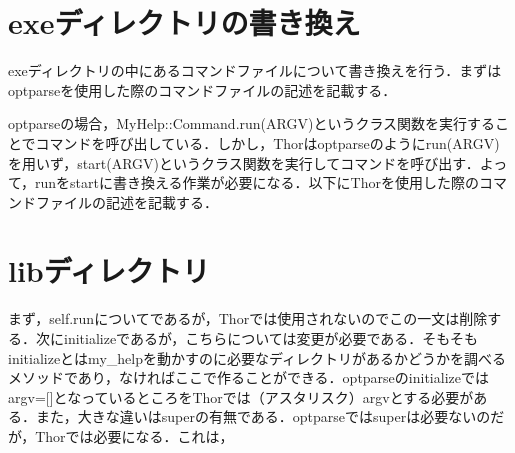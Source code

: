 \section{exeディレクトリの書き換え}\label{exeux30c7ux30a3ux30ecux30afux30c8ux30eaux306eux66f8ux304dux63dbux3048}

exeディレクトリの中にあるコマンドファイルについて書き換えを行う．まずはoptparseを使用した際のコマンドファイルの記述を記載する．

\begin{Shaded}
\begin{Highlighting}[]

\NormalTok{::}\NormalTok{)}
\end{Highlighting}
\end{Shaded}

optparseの場合，MyHelp::Command.run(ARGV)というクラス関数を実行することでコマンドを呼び出している．しかし，Thorはoptparseのようにrun(ARGV)を用いず，start(ARGV)というクラス関数を実行してコマンドを呼び出す．よって，runをstartに書き換える作業が必要になる．以下にThorを使用した際のコマンドファイルの記述を記載する．

\begin{Shaded}
\begin{Highlighting}[]

\NormalTok{::}\NormalTok{)}
\end{Highlighting}
\end{Shaded}

\section{libディレクトリ}\label{libux30c7ux30a3ux30ecux30afux30c8ux30ea}

まず，self.runについてであるが，Thorでは使用されないのでこの一文は削除する．次にinitializeであるが，こちらについては変更が必要である．そもそもinitializeとはmy\_helpを動かすのに必要なディレクトリがあるかどうかを調べるメソッドであり，なければここで作ることができる．optparseのinitializeではargv={[}{]}となっているところをThorでは（アスタリスク）argvとする必要がある．また，大きな違いはsuperの有無である．optparseではsuperは必要ないのだが，Thorでは必要になる．これは，


